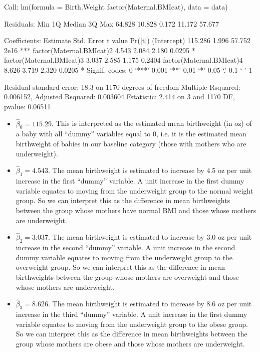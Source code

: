 \documentclass[letterpaper,10pt,english]{jupyterBook}
\begin{document}
\begin{sphinxVerbatim}[commandchars=\\\{\}]
Call:
lm(formula = Birth.Weight \PYGZti{} factor(Maternal.BMIcat), data = data)

Residuals:
    Min      1Q  Median      3Q     Max 
\PYGZhy{}64.828 \PYGZhy{}10.828   0.172  11.172  57.677 

Coefficients:
                         Estimate Std. Error t value Pr(\PYGZgt{}|t|)    
(Intercept)               115.286      1.996  57.752   \PYGZlt{}2e\PYGZhy{}16 ***
factor(Maternal.BMIcat)2    4.543      2.084   2.180   0.0295 *  
factor(Maternal.BMIcat)3    3.037      2.585   1.175   0.2404    
factor(Maternal.BMIcat)4    8.626      3.719   2.320   0.0205 *  
\PYGZhy{}\PYGZhy{}\PYGZhy{}
Signif. codes:  0 ‘***’ 0.001 ‘**’ 0.01 ‘*’ 0.05 ‘.’ 0.1 ‘ ’ 1

Residual standard error: 18.3 on 1170 degrees of freedom
Multiple R\PYGZhy{}squared:  0.006152,	Adjusted R\PYGZhy{}squared:  0.003604 
F\PYGZhy{}statistic: 2.414 on 3 and 1170 DF,  p\PYGZhy{}value: 0.06511
\end{sphinxVerbatim}
\begin{itemize}
\item {} 
\sphinxAtStartPar
\(\hat{\beta}_0 = 115.29\). This is interpreted as the estimated mean birthweight (in oz) of a baby with all “dummy” variables equal to 0, i.e. it is the estimated mean birthweight of babies in our baseline category (those with mothers who are underweight).

\item {} 
\sphinxAtStartPar
\(\hat{\beta}_1= 4.543\). The mean birthweight is estimated to increase by 4.5 oz per unit increase in the first “dummy” variable. A unit increase in the first dummy variable equates to moving from the underweight group to the normal weight group. So we can interpret this as the difference in mean birthweights between the group whose mothers have normal BMI and those whose mothers are underweight.

\item {} 
\sphinxAtStartPar
\(\hat{\beta}_2= 3.037\). The mean birthweight is estimated to increase by 3.0 oz per unit increase in the second “dummy” variable. A unit increase in the second dummy variable equates to moving from the underweight group to the overweight group. So we can interpret this as the difference in mean birthweights between the group whose mothers are overweight and those whose mothers are underweight.

\item {} 
\sphinxAtStartPar
\(\hat{\beta}_3= 8.626\). The mean birthweight is estimated to increase by 8.6 oz per unit increase in the third “dummy” variable. A unit increase in the first dummy variable equates to moving from the underweight group to the obese group. So we can interpret this as the difference in mean birthweights between the group whose mothers are obese and those whose mothers are underweight.

\end{itemize}
\end{document}
